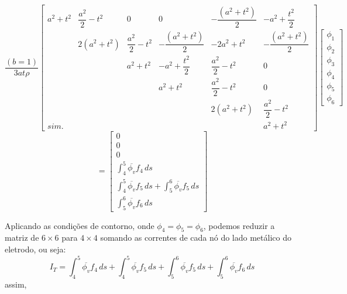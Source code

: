 \documentclass[
12pt,
a4paper,
oneside,
chapter=TITLE,
sumario=tradicional
]{abntex2}
\begin{document}
$$
\frac{(b=1)}{3 a t \rho}
\begin{bmatrix}
	a^2 + t^2 & \dfrac{a^2}{2} - t^2 & 0 & 0 & -\dfrac{(a^2 + t^2)}{2} & -a^2 + \dfrac{t^2}{2} \\
	& 2(a^2 + t^2) & \dfrac{a^2}{2} - t^2 & -\dfrac{(a^2 + t^2)}{2} & -2a^2 + t^2 & -\dfrac{(a^2 + t^2)}{2} \\
	&               & a^2 + t^2 & -a^2 + \dfrac{t^2}{2} & \dfrac{a^2}{2} -t^2& 0 \\
	&               &            & a^2 + t^2 & \dfrac{a^2}{2} - t^2 & 0 \\
	&               &            &            & 2(a^2 + t^2) & \dfrac{a^2}{2} - t^2 \\
sim.	&               &            &            &                & a^2 + t^2
\end{bmatrix}
\begin{bmatrix}
	\phi_1 \\
	\phi_2 \\
	\phi_3 \\
	\phi_4 \\
	\phi_5 \\
	\phi_6
\end{bmatrix}
$$
\begin{equation}
=
\begin{bmatrix}
	0 \\
	0 \\
	0 \\
	\int_4^5 \overline{\phi_v} f_4 \, ds \\
	\int_4^5 \overline{\phi_v} f_5 \, ds + \int_5^6 \overline{\phi_v} f_5 \, ds \\
	\int_5^6 \overline{\phi_v} f_6 \, ds
\end{bmatrix}
\label{eq:MEF_eq_0012}  
\end{equation}

Aplicando as condições de contorno, onde $\phi_4 = \phi_5 = \phi_6$, podemos reduzir a matriz de $6 \times 6$ para  $4 \times 4$ somando as correntes de cada nó do lado metálico do eletrodo, ou seja: 
$$
I_T = \int_{4}^{5} \overline{\phi_v} f_4 \, ds 
+ \int_{4}^{5} \overline{\phi_v} f_5 \, ds 
+ \int_{5}^{6} \overline{\phi_v} f_5 \, ds 
+ \int_{5}^{6} \overline{\phi_v} f_6 \, ds
$$
assim,
\end{document}
